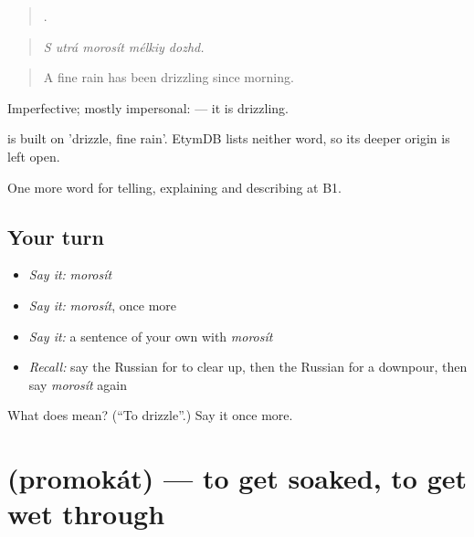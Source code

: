 \begin{quote}
    .
\end{quote}

\begin{quote}
\emph{S utrá morosít mélkiy dozhd.}
\end{quote}

\begin{quote}
A fine rain has been drizzling since morning.
\end{quote}

Imperfective; mostly impersonal: \emph{} — it is drizzling.

\begin{cousinweb}
\emph{} is built on \emph{} 'drizzle, fine rain'. EtymDB lists neither word, so its deeper origin is left open.
\end{cousinweb}

\begin{grammarlens}[title={What you've built}]
One more word for telling, explaining and describing at B1.
\end{grammarlens}

\subsection*{Your turn}
\begin{itemize}
\raggedright
  \item \emph{Say it:} \emph{morosít}
  \item \emph{Say it:} \emph{morosít}, once more
  \item \emph{Say it:} a sentence of your own with \emph{morosít}
  \item \emph{Recall:} say the Russian for to clear up, then the Russian for a downpour, then say \emph{morosít} again
\end{itemize}

\begin{tcolorbox}[breakable,colback=teal!4,colframe=teal!35!black,title={Before you move on}]
What does  mean? (\textquotedblleft{}To drizzle\textquotedblright{}.) Say it once more.
\end{tcolorbox}
\section[\texorpdfstring{\ru{промокать} (promokát)}{промокать (promokát)}]{ (promokát) — to get soaked, to get wet through}

